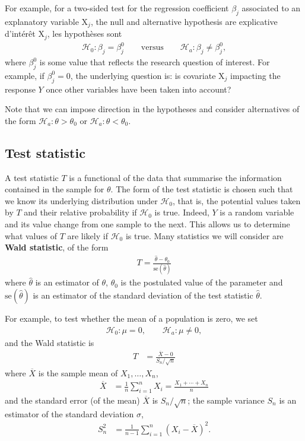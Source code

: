 \documentclass[
  11pt,
  letterpaper,
]{book}
\theoremstyle{definition}
\theoremstyle{definition}
\theoremstyle{definition}
\theoremstyle{definition}
\theoremstyle{remark}
\begin{document}
For example, for a two-sided test for the regression coefficient \(\beta_j\) associated to an explanatory variable \(\mathrm{X}_j\), the null and alternative hypothesis are
explicative d'intérêt \(\mathrm{X}_j\), les hypothèses sont
\begin{align*}
\mathscr{H}_0: \beta_j=\beta_j^0 \qquad \text{versus} \qquad \mathscr{H}_a:\beta_j \neq \beta_j^0,
\end{align*}
where \(\beta_j^0\) is some value that reflects the research question of interest. For example, if \(\beta_j^0=0\), the underlying question is: is covariate \(\mathrm{X}_j\) impacting the response \(Y\) once other variables have been taken into account?

Note that we can impose direction in the hypotheses and consider alternatives of the form \(\mathscr{H}_a: \theta > \theta_0\) or \(\mathscr{H}_a: \theta < \theta_0\).

\hypertarget{test-statistic}{%
\subsection{Test statistic}\label{test-statistic}}

A test statistic \(T\) is a functional of the data that summarise the information contained in the sample for \(\theta\). The form of the test statistic is chosen such that we know its underlying distribution under \(\mathscr{H}_0\), that is, the potential values taken by \(T\) and their relative probability if \(\mathscr{H}_0\) is true. Indeed, \(Y\) is a random variable and its value change from one sample to the next.
This allows us to determine what values of \(T\) are likely if \(\mathscr{H}_0\) is true. Many statistics we will consider are \textbf{Wald statistic}, of the form
\begin{align*}
T = \frac{\widehat{\theta} - \theta_0}{\mathrm{se}(\widehat{\theta})}
\end{align*}
where \(\widehat{\theta}\) is an estimator of \(\theta\), \(\theta_0\) is the postulated value of the parameter and \(\mathrm{se}(\widehat{\theta})\) is an estimator of the standard deviation of the test statistic \(\widehat{\theta}\).

For example, to test whether the mean of a population is zero, we set
\begin{align*}
\mathscr{H}_0: \mu=0, \qquad  \mathscr{H}_a:\mu \neq 0,
\end{align*}
and the Wald statistic is
\begin{align*}
T &= \frac{\overline{X}-0}{S_n/\sqrt{n}}
\end{align*}
where \(\overline{X}\) is the sample mean of \(X_1, \ldots, X_n\),
\begin{align*}
\overline{X} &= \frac{1}{n} \sum_{i=1}^n X_i = \frac{X_1+ \cdots + X_n}{n}
\end{align*}
and the standard error (of the mean) \(\overline{X}\) is \(S_n/\sqrt{n}\); the sample variance \(S_n\) is an estimator of the standard deviation \(\sigma\),
\begin{align*}
S^2_n &= \frac{1}{n-1} \sum_{i=1}^n (X_i-\overline{X})^2.
\end{align*}
\end{document}
